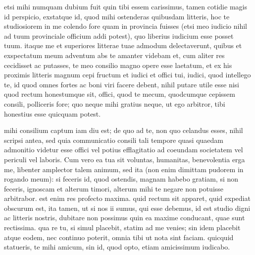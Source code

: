 


 etsi mihi numquam dubium fuit quin tibi essem carissimus, tamen cotidie magis id perspicio, exstatque id, quod mihi ostenderas quibusdam litteris, hoc te studiosiorem in me colendo fore quam in provincia fuisses (etsi meo iudicio nihil ad tuum provinciale officium addi potest), quo liberius iudicium esse posset tuum. itaque me et superiores litterae tuae admodum delectaverunt, quibus et exspectatum meum adventum abs te amanter videbam et, cum aliter res cecidisset ac putasses, te meo consilio magno opere esse laetatum, et ex his proximis litteris magnum cepi fructum et iudici et offici tui, iudici, quod intellego te, id quod omnes fortes ac boni viri facere debent, nihil putare utile esse nisi quod rectum honestumque sit, offici, quod te mecum, quodcumque cepissem consili, polliceris fore; quo neque mihi gratius neque, ut ego arbitror, tibi honestius esse quicquam potest.

 mihi consilium captum iam diu est; de quo ad te, non quo celandus esses, nihil scripsi antea, sed quia communicatio consili tali tempore quasi quaedam admonitio videtur esse offici vel potius efflagitatio ad coeundam societatem vel periculi vel laboris. Cum vero ea tua sit voluntas, humanitas, benevolentia erga me, libenter amplector talem animum, sed ita (non enim dimittam pudorem in rogando meum): si feceris id, quod ostendis, magnam habebo gratiam, si non feceris, ignoscam et alterum timori, alterum mihi te negare non potuisse arbitrabor. est enim res profecto maxima. quid rectum sit apparet, quid expediat obscurum est, ita tamen, ut si nos ii sumus, qui esse debemus, id est studio digni ac litteris nostris, dubitare non possimus quin ea maxime conducant, quae sunt rectissima. qua re tu, si simul placebit, statim ad me venies; sin idem placebit atque eodem, nec continuo poterit, omnia tibi ut nota sint faciam. quicquid statueris, te mihi amicum, sin id, quod opto, etiam amicissimum iudicabo.
